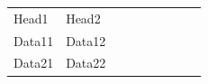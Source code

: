 
\begin{tabular}{p{0.25\linewidth}@{\qquad}l}
  Head1  &  Head2  \\
  \relax%

  Data11  &  Data12  \\
  Data21  &  Data22  \\
\end{tabular}

